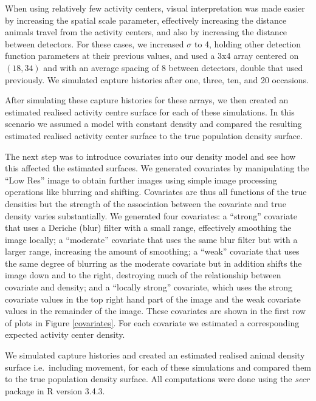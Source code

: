 \documentclass[10pt,a4paper]{article}
\begin{document}
When using relatively few activity centers, visual interpretation was made easier by increasing the spatial scale parameter, effectively increasing the distance animals travel from the activity centers, and also by increasing the distance between detectors. For these cases, we increased $\sigma$ to 4, holding other detection function parameters at their previous values, and used a 3x4 array centered on $(18,34)$ and with an average spacing of 8 between detectors, double that used previously. We simulated capture histories after one, three, ten, and 20 occasions. 

After simulating these capture histories for these arrays, we then created an estimated realised activity centre surface for each of these simulations. In this scenario we assumed a model with constant density and compared the resulting estimated realised activity center surface to the true population density surface.

The next step was to introduce covariates into our density model and see how this affected the estimated surfaces. We generated covariates by manipulating the ``Low Res'' image to obtain further images using simple image processing operations like blurring and shifting. Covariates are thus all functions of the true densities but the strength of the association between the covariate and true density varies substantially. We generated four covariates: a ``strong'' covariate that uses a Deriche (blur) filter with a small range, effectively smoothing the image locally; a ``moderate'' covariate that uses the same blur filter but with a larger range, increasing the amount of smoothing; a ``weak'' covariate that uses the same degree of blurring as the moderate covariate but in addition shifts the image down and to the right, destroying much of the relationship between covariate and density; and a ``locally strong'' covariate, which uses the strong covariate values in the top right hand part of the image and the weak covariate values in the remainder of the image. These covariates are shown in the first row of plots in Figure \ref{covariates}. For each covariate we estimated a corresponding expected activity center density.

We simulated capture histories and created an estimated realised animal density surface i.e.\ including movement, for each of these simulations and compared them to the true population density surface. All computations were done using the {\it secr} package in R version 3.4.3. 
\end{document}
